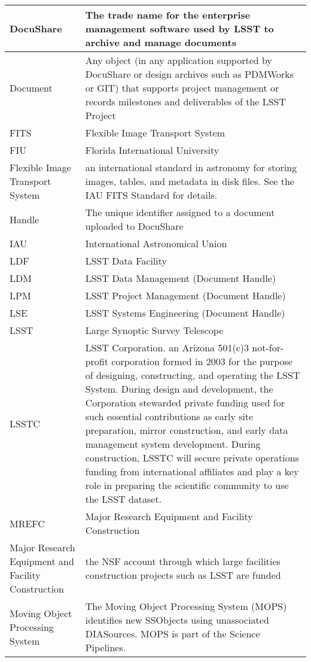 \begin{longtable}{|l|p{}|}
DocuShare & The trade name for the enterprise management software used by \gls{LSST} to archive and manage documents \\\hline
Document & Any object (in any application supported by \gls{DocuShare} or design archives such as PDMWorks or GIT) that supports project management or records milestones and deliverables of the \gls{LSST} Project \\\hline
FITS & \gls{Flexible Image Transport System} \\\hline
FIU & Florida International University \\\hline
Flexible Image Transport System & an international standard in astronomy for storing images, tables, and \gls{metadata} in disk files. See the \gls{IAU} \gls{FITS} Standard for details. \\\hline
Handle & The unique identifier assigned to a document uploaded to \gls{DocuShare} \\\hline
IAU & International Astronomical Union \\\hline
LDF & \gls{LSST} Data Facility \\\hline
LDM & \gls{LSST} \gls{Data Management} (\gls{Document} \gls{Handle}) \\\hline
LPM & \gls{LSST} Project Management (\gls{Document} \gls{Handle}) \\\hline
LSE & \gls{LSST} \gls{Systems Engineering} (\gls{Document} \gls{Handle}) \\\hline
LSST & Large Synoptic Survey Telescope \\\hline
LSSTC & \gls{LSST} Corporation. an Arizona 501(c)3 not-for-profit corporation formed in 2003 for the purpose of designing, constructing, and operating the \gls{LSST} System. During design and development, the Corporation stewarded private funding used for such essential contributions as early site preparation, mirror construction, and early data management system development. During construction, \gls{LSSTC} will secure private operations funding from international affiliates and play a key role in preparing the scientific community to use the \gls{LSST} dataset. \\\hline
MREFC & \gls{Major Research Equipment and Facility Construction} \\\hline
Major Research Equipment and Facility \gls{Construction} & the \gls{NSF} account through which large facilities construction projects such as \gls{LSST} are funded \\\hline
Moving Object Processing System & The \gls{Moving Object Processing System} (\gls{MOPS}) identifies new SSObjects using unassociated DIASources. \gls{MOPS} is part of the \gls{Science Pipelines}. \\\hline

\end{longtable}
